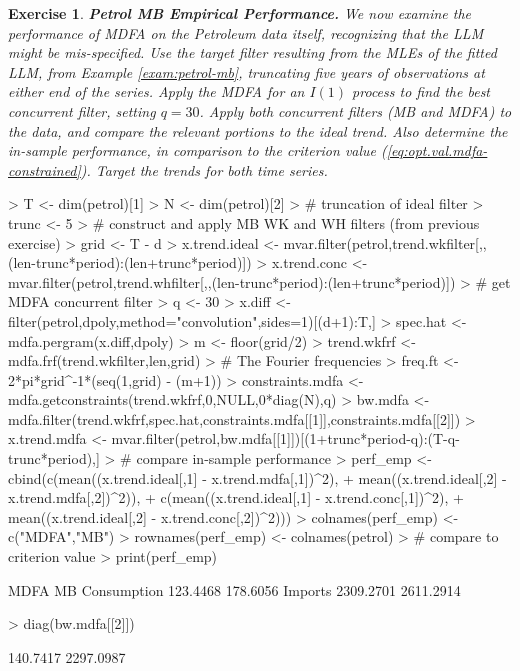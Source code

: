 \documentclass[a4paper]{book}
\newtheorem{Exercise}{Exercise}
\begin{document}
\begin{Exercise} {\bf Petrol MB Empirical Performance.}  \rm
\label{exer:petrol-mb3}
 We now examine the performance of MDFA   on the Petroleum data itself,
 recognizing that the LLM might be mis-specified.  
 Use the target filter resulting from the MLEs of the fitted LLM,
  from Example \ref{exam:petrol-mb}, truncating five years of observations at either end
   of the series.  
 Apply the  MDFA  for an $I(1)$ process  to find the best
 concurrent filter, setting $q= 30$.
  Apply both concurrent filters (MB and MDFA)
 to the data, and compare the relevant portions to the ideal trend.
 Also determine the in-sample performance, in comparison to the criterion value
 (\ref{eq:opt.val.mdfa-constrained}).   Target the trends for both time series.
\end{Exercise}
    
    
\begin{Schunk}
\begin{Sinput}
> T <- dim(petrol)[1]
> N <- dim(petrol)[2]
> # truncation of ideal filter
> trunc <- 5
> # construct and apply MB WK and WH filters (from previous exercise)
> grid <- T - d
> x.trend.ideal <- mvar.filter(petrol,trend.wkfilter[,,(len-trunc*period):(len+trunc*period)])
> x.trend.conc <- mvar.filter(petrol,trend.whfilter[,,(len-trunc*period):(len+trunc*period)])
> # get MDFA concurrent filter
> q <- 30
> x.diff <- filter(petrol,dpoly,method="convolution",sides=1)[(d+1):T,]
> spec.hat <- mdfa.pergram(x.diff,dpoly)
> m <- floor(grid/2)
> trend.wkfrf <- mdfa.frf(trend.wkfilter,len,grid)
> # The Fourier frequencies
> freq.ft <- 2*pi*grid^{-1}*(seq(1,grid) - (m+1))
> constraints.mdfa <- mdfa.getconstraints(trend.wkfrf,0,NULL,0*diag(N),q)
> bw.mdfa <- mdfa.filter(trend.wkfrf,spec.hat,constraints.mdfa[[1]],constraints.mdfa[[2]])
> x.trend.mdfa <- mvar.filter(petrol,bw.mdfa[[1]])[(1+trunc*period-q):(T-q-trunc*period),]
> # compare in-sample performance
> perf_emp <- cbind(c(mean((x.trend.ideal[,1] - x.trend.mdfa[,1])^2),
+ 	mean((x.trend.ideal[,2] - x.trend.mdfa[,2])^2)),
+   c(mean((x.trend.ideal[,1] - x.trend.conc[,1])^2),
+ 	mean((x.trend.ideal[,2] - x.trend.conc[,2])^2)))
> colnames(perf_emp) <- c("MDFA","MB")
> rownames(perf_emp) <- colnames(petrol)
> # compare to criterion value
> print(perf_emp)
\end{Sinput}
\begin{Soutput}
                 MDFA        MB
Consumption  123.4468  178.6056
Imports     2309.2701 2611.2914
\end{Soutput}
\begin{Sinput}
> diag(bw.mdfa[[2]])
\end{Sinput}
\begin{Soutput}
[1]  140.7417 2297.0987
\end{Soutput}
\end{Schunk}
    
\end{document}
